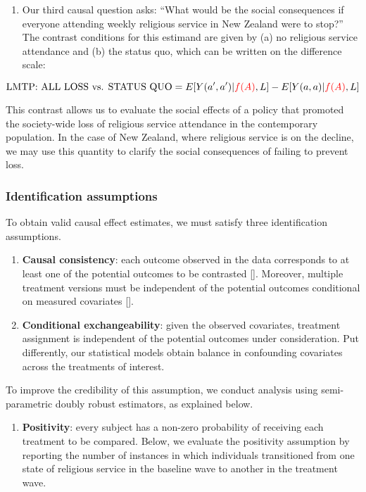 \documentclass[
  singlecolumn]{article}
\providecommand{\tightlist}{%
  \setlength{\itemsep}{0pt}\setlength{\parskip}{0pt}}\usepackage{longtable,booktabs,array}
\begin{document}
\begin{enumerate}
\def\labelenumi{\arabic{enumi}.}
\setcounter{enumi}{1}
\tightlist
\item
  Our third causal question asks: ``What would be the social
  consequences if everyone attending weekly religious service in New
  Zealand were to stop?'' The contrast conditions for this estimand are
  given by (a) no religious service attendance and (b) the status quo,
  which can be written on the difference scale:
\end{enumerate}

\[ \text{LMTP: ALL LOSS vs. STATUS QUO}  = E[Y(a^\prime,a^\prime)|\textcolor{red}{f(A)},L] - E[Y(a,a)|\textcolor{red}{f(A)},L] \]

This contrast allows us to evaluate the social effects of a policy that
promoted the society-wide loss of religious service attendance in the
contemporary population. In the case of New Zealand, where religious
service is on the decline, we may use this quantity to clarify the
social consequences of failing to prevent loss.

\subsubsection{Identification
assumptions}\label{identification-assumptions}

To obtain valid causal effect estimates, we must satisfy three
identification assumptions.

\begin{enumerate}
\def\labelenumi{\arabic{enumi}.}
\item
  \textbf{Causal consistency}: each outcome observed in the data
  corresponds to at least one of the potential outcomes to be contrasted
  {[}{]}. Moreover, multiple treatment versions must be independent of
  the potential outcomes conditional on measured covariates {[}{]}.
\item
  \textbf{Conditional exchangeability}: given the observed covariates,
  treatment assignment is independent of the potential outcomes under
  consideration. Put differently, our statistical models obtain balance
  in confounding covariates across the treatments of interest.
\end{enumerate}

To improve the credibility of this assumption, we conduct analysis using
semi-parametric doubly robust estimators, as explained below.

\begin{enumerate}
\def\labelenumi{\arabic{enumi}.}
\setcounter{enumi}{2}
\tightlist
\item
  \textbf{Positivity}: every subject has a non-zero probability of
  receiving each treatment to be compared. Below, we evaluate the
  positivity assumption by reporting the number of instances in which
  individuals transitioned from one state of religious service in the
  baseline wave to another in the treatment wave.
\end{enumerate}
\end{document}
